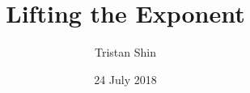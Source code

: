 \documentclass[a4paper, 12pt]{article}
\title{Lifting the Exponent}
\author{Tristan Shin}
\date{24 July 2018}
\begin{document}
\maketitle


\hrulefill

\begin{solution}
\end{solution}
\end{document}
